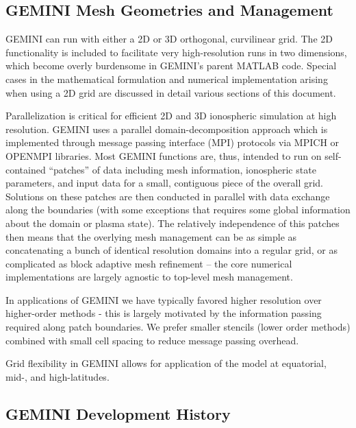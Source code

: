 \documentclass[11pt,letterpaper]{article}
\begin{document}
\subsection{GEMINI Mesh Geometries and Management}

GEMINI can run with either a 2D or 3D orthogonal, curvilinear grid.  The 2D functionality is included to facilitate very high-resolution runs in two dimensions, which become overly burdensome in GEMINI's parent MATLAB code.  Special cases in the mathematical formulation and numerical implementation arising when using a 2D grid are discussed in detail various sections of this document.  

Parallelization is critical for efficient 2D and 3D ionospheric simulation at high resolution.  GEMINI uses a parallel domain-decomposition approach which is implemented through message passing interface (MPI) protocols via MPICH or OPENMPI libraries.  Most GEMINI functions are, thus, intended to run on self-contained ``patches'' of data including mesh information, ionospheric state parameters, and input data for a small, contiguous piece of the overall grid.  Solutions on these patches are then conducted in parallel with data exchange along the boundaries (with some exceptions that requires some global information about the domain or plasma state).  The relatively independence of this patches then means that the overlying mesh management can be as simple as concatenating a bunch of identical resolution domains into a regular grid, or as complicated as block adaptive mesh refinement -- the core numerical implementations are largely agnostic to top-level mesh management.  

In applications of GEMINI we have typically favored higher resolution over higher-order methods - this is largely motivated by the information passing required along patch boundaries.  We prefer smaller stencils (lower order methods) combined with small cell spacing to reduce message passing overhead.  

Grid flexibility in GEMINI allows for application of the model at equatorial, mid-, and high-latitudes.  

\subsection{GEMINI Development History}
\end{document}

